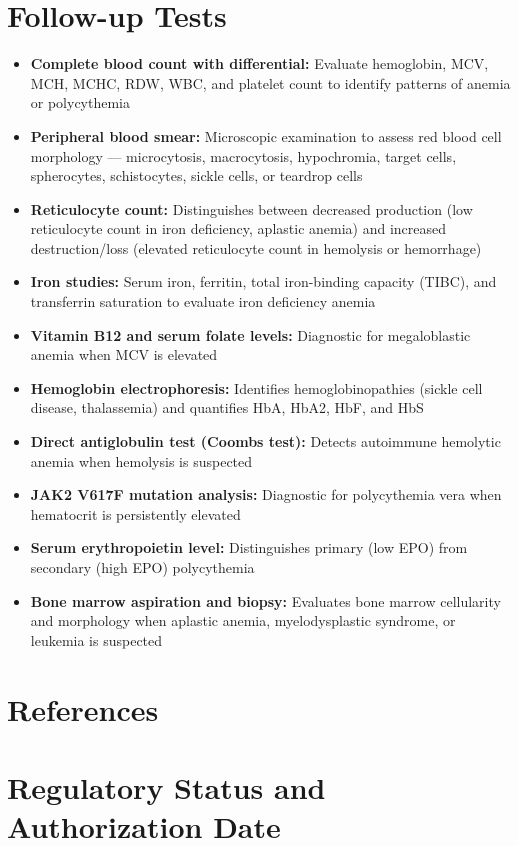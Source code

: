 \section*{Follow-up Tests}
\begin{itemize}
  \item \textbf{Complete blood count with differential:} Evaluate hemoglobin, MCV, MCH, MCHC, RDW, WBC, and platelet count to identify patterns of anemia or polycythemia
  \item \textbf{Peripheral blood smear:} Microscopic examination to assess red blood cell morphology --- microcytosis, macrocytosis, hypochromia, target cells, spherocytes, schistocytes, sickle cells, or teardrop cells
  \item \textbf{Reticulocyte count:} Distinguishes between decreased production (low reticulocyte count in iron deficiency, aplastic anemia) and increased destruction/loss (elevated reticulocyte count in hemolysis or hemorrhage)
  \item \textbf{Iron studies:} Serum iron, ferritin, total iron-binding capacity (TIBC), and transferrin saturation to evaluate iron deficiency anemia
  \item \textbf{Vitamin B12 and serum folate levels:} Diagnostic for megaloblastic anemia when MCV is elevated
  \item \textbf{Hemoglobin electrophoresis:} Identifies hemoglobinopathies (sickle cell disease, thalassemia) and quantifies HbA, HbA2, HbF, and HbS
  \item \textbf{Direct antiglobulin test (Coombs test):} Detects autoimmune hemolytic anemia when hemolysis is suspected
  \item \textbf{JAK2 V617F mutation analysis:} Diagnostic for polycythemia vera when hematocrit is persistently elevated
  \item \textbf{Serum erythropoietin level:} Distinguishes primary (low EPO) from secondary (high EPO) polycythemia
  \item \textbf{Bone marrow aspiration and biopsy:} Evaluates bone marrow cellularity and morphology when aplastic anemia, myelodysplastic syndrome, or leukemia is suspected
\end{itemize}

\section*{References}



\clearpage
\section*{Regulatory Status and Authorization Date}

\clearpage
